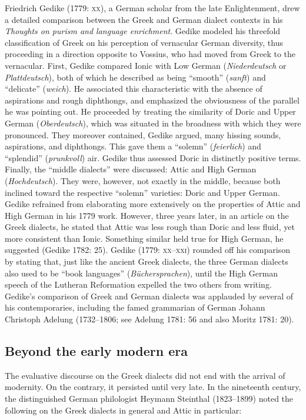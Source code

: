 \begin{styleStandard}
Friedrich Gedike (1779: \textsc{xx}), a German scholar from the late Enlightenment, drew a detailed comparison between the Greek and German dialect contexts in his \textit{Thoughts on purism and language enrichment}. Gedike modeled his threefold classification of Greek on his perception of vernacular German diversity, thus proceeding in a direction opposite to Vossius, who had moved from Greek to the vernacular. First, Gedike compared Ionic with Low German (\textit{Niederdeutsch} or \textit{Plattdeutsch}), both of which he described as being “smooth” (\textit{sanft}) and “delicate” (\textit{weich}). He associated this characteristic with the absence of aspirations and rough diphthongs, and emphasized the obviousness of the parallel he was pointing out. He proceeded by treating the similarity of Doric and Upper German (\textit{Oberdeutsch}), which was situated in the broadness with which they were pronounced. They moreover contained, Gedike argued, many hissing sounds, aspirations, and diphthongs. This gave them a “solemn” (\textit{feierlich}) and “splendid” (\textit{prunkvoll}) air. Gedike thus assessed Doric in distinctly positive terms. Finally, the “middle dialects” were discussed: Attic and High German (\textit{Hochdeutsch}). They were, however, not exactly in the middle, because both inclined toward the respective “solemn” varieties: Doric and Upper German. Gedike refrained from elaborating more extensively on the properties of Attic and High German in his 1779 work. However, three years later, in an article on the Greek dialects, he stated that Attic was less rough than Doric and less fluid, yet more consistent than Ionic. Something similar held true for High German, he suggested (Gedike 1782: 25). Gedike (1779: \textsc{xx–xxi)} rounded off his comparison by stating that, just like the ancient Greek dialects, the three German dialects also used to be “book languages” (\textit{Büchersprachen}), until the High German speech of the Lutheran Reformation expelled the two others from writing. Gedike’s comparison of Greek and German dialects was applauded by several of his contemporaries, including the famed grammarian of German Johann Christoph Adelung (1732–1806; see Adelung 1781: 56 and also Moritz 1781: 20).
\end{styleStandard}

\subsection{Beyond the early modern era}
\hypertarget{Toc19704853}{}\begin{styleStandard}
The evaluative discourse on the Greek dialects did not end with the arrival of modernity. On the contrary, it persisted until very late. In the nineteenth century, the distinguished German philologist Heymann Steinthal (1823–1899) noted the following on the Greek dialects in general and Attic in particular:
\end{styleStandard}

